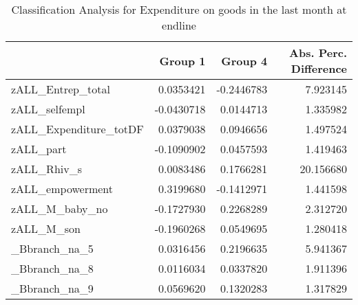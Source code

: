 \begin{table}

\caption{\label{tab:clanQExpenditure_totDF}Classification Analysis for Expenditure on goods in the last month at endline}
\centering
\begin{tabular}[t]{lrrr}
\toprule
  & Group 1 & Group 4 & Abs. Perc. Difference\\
\midrule
zALL\_Entrep\_total & 0.0353421 & -0.2446783 & 7.923145\\
zALL\_selfempl & -0.0430718 & 0.0144713 & 1.335982\\
zALL\_Expenditure\_totDF & 0.0379038 & 0.0946656 & 1.497524\\
zALL\_part & -0.1090902 & 0.0457593 & 1.419463\\
zALL\_Rhiv\_s & 0.0083486 & 0.1766281 & 20.156680\\
\addlinespace
zALL\_empowerment & 0.3199680 & -0.1412971 & 1.441598\\
zALL\_M\_baby\_no & -0.1727930 & 0.2268289 & 2.312720\\
zALL\_M\_son & -0.1960268 & 0.0549695 & 1.280418\\
\_Bbranch\_na\_5 & 0.0316456 & 0.2196635 & 5.941367\\
\_Bbranch\_na\_8 & 0.0116034 & 0.0337820 & 1.911396\\
\addlinespace
\_Bbranch\_na\_9 & 0.0569620 & 0.1320283 & 1.317829\\
\bottomrule
\end{tabular}
\end{table}
